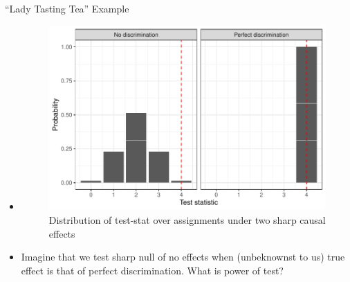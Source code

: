 \documentclass[table, xcolor = {dvipsnames}, 9pt]{beamer}
\theoremstyle{plain}
\begin{document}
\begin{frame}{``Lady Tasting Tea'' Example}
\vfill
\begin{itemize}
\item[]
\begin{figure}[H]
\includegraphics[width=0.9\linewidth]{perfect_discrim_test_stat_plot.pdf}
\caption{Distribution of test-stat over assignments under two sharp causal effects}
\end{figure} \vfill
\item Imagine that we test sharp null of no effects when (unbeknownst to us) true effect is that of perfect discrimination. What is power of test?
\end{itemize}  
\end{frame}
\end{document}
